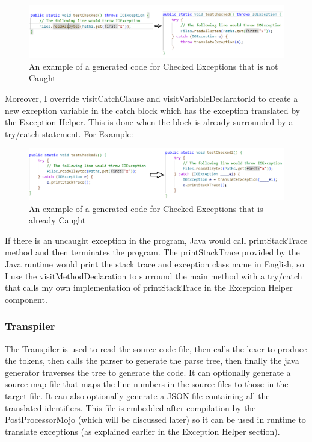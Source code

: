 \begin{figure}[H]
\centering
\includegraphics[width=15cm]{ch3-images/checked.png}
\caption{An example of a generated code for Checked Exceptions that is not Caught}
\label{fig:An example of a generated code for Checked Exceptions that is not Caught}
\end{figure} 

Moreover, I override visitCatchClause and visitVariableDeclaratorId to create a new exception variable in the catch block which has the exception translated by the Exception Helper. This is done when the block is already surrounded by a try/catch statement. For Example:

\begin{figure}[H]
\centering
\includegraphics[width=15cm]{ch3-images/checked2.png}
\caption{An example of a generated code for Checked Exceptions that is already Caught}
\label{fig:An example of a generated code for Checked Exceptions that is already Caught}
\end{figure} 

If there is an uncaught exception in the program, Java would call printStackTrace method and then terminates the program. The printStackTrace provided by the Java runtime would print the stack trace and exception class name in English, so I use the visitMethodDeclaration to surround the main method with a try/catch that calls my own implementation of printStackTrace in the Exception Helper component.
\subsubsection{Transpiler}
The Transpiler is used to read the source code file, then calls the lexer to produce the tokens, then calls the parser to generate the parse tree, then finally the java generator traverses the tree to generate the code. It can optionally generate a source map file that maps the line numbers in the source files to those in the target file. It can also optionally generate a JSON file containing all the translated identifiers. This file is embedded after compilation by the PostProcessorMojo (which will be discussed later) so it can be used in runtime to translate exceptions (as explained earlier in the Exception Helper section).

